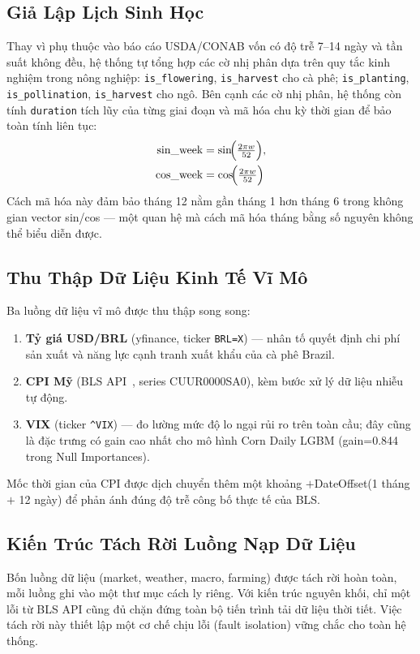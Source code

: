 \documentclass[conference]{IEEEtran}
\begin{document}
\subsection{Giả Lập Lịch Sinh Học}
Thay vì phụ thuộc vào báo cáo USDA/CONAB vốn có độ trễ 7--14 ngày và tần suất
không đều, hệ thống tự tổng hợp các cờ nhị phân dựa trên quy tắc kinh nghiệm
trong nông nghiệp: \texttt{is\_flowering}, \texttt{is\_harvest} cho cà phê;
\texttt{is\_planting}, \texttt{is\_pollination}, \texttt{is\_harvest} cho ngô.
Bên cạnh các cờ nhị phân, hệ thống còn tính \texttt{duration} tích lũy của
từng giai đoạn và mã hóa chu kỳ thời gian để bảo toàn tính liên tục:
\begin{equation}
\begin{aligned}
\text{sin\_week} &= \sin\!\Bigl(\tfrac{2\pi w}{52}\Bigr), \\
\text{cos\_week} &= \cos\!\Bigl(\tfrac{2\pi w}{52}\Bigr)
\end{aligned}
\label{eq:cyclic}
\end{equation}
Cách mã hóa này đảm bảo tháng 12 nằm gần tháng 1 hơn tháng 6 trong không gian
vector sin/cos --- một quan hệ mà cách mã hóa tháng bằng số nguyên không thể
biểu diễn được.
\subsection{Thu Thập Dữ Liệu Kinh Tế Vĩ Mô}
Ba luồng dữ liệu vĩ mô được thu thập song song:
\begin{enumerate}
\item \textbf{Tỷ giá USD/BRL} (yfinance, ticker \texttt{BRL=X}) --- nhân tố
  quyết định chi phí sản xuất và năng lực cạnh tranh xuất khẩu của cà phê
  Brazil.
\item \textbf{CPI Mỹ} (BLS API~\cite{bls2026}, series CUUR0000SA0), kèm bước
  xử lý dữ liệu nhiễu tự động.
\item \textbf{VIX} (ticker \texttt{\^{}VIX}) --- đo lường mức độ lo ngại rủi
  ro trên toàn cầu; đây cũng là đặc trưng có gain cao nhất cho mô hình Corn
  Daily LGBM (gain=0.844 trong Null Importances).
\end{enumerate}
Mốc thời gian của CPI được dịch chuyển thêm một khoảng $+$DateOffset(1 tháng
$+$ 12 ngày) để phản ánh đúng độ trễ công bố thực tế của BLS.
\subsection{Kiến Trúc Tách Rời Luồng Nạp Dữ Liệu}
Bốn luồng dữ liệu (market, weather, macro, farming) được tách rời hoàn toàn,
mỗi luồng ghi vào một thư mục cách ly riêng. Với kiến trúc nguyên khối, chỉ
một lỗi từ BLS API cũng đủ chặn đứng toàn bộ tiến trình tải dữ liệu thời
tiết. Việc tách rời này thiết lập một cơ chế chịu lỗi (fault isolation) vững
chắc cho toàn hệ thống.
\end{document}
